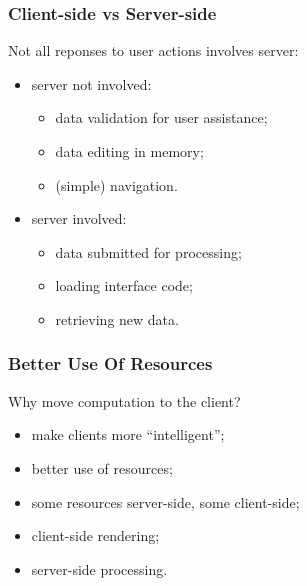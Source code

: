 \documentclass[svgnames]{beamer}
\begin{document}
\begin{frame}
\frametitle{Client-side vs Server-side}

Not all reponses to user actions involves server:
\begin{itemize}
\item server not involved:
  \begin{itemize}
  \item data validation for user assistance;
  \item data editing in memory;
  \item (simple) navigation.
  \end{itemize}

\item server involved:
  \begin{itemize}
  \item data submitted for processing;
  \item loading interface code;
  \item retrieving new data.
  \end{itemize}
\end{itemize}
\end{frame}


\begin{frame}\frametitle{Better Use Of Resources}

Why move computation to the client?
\begin{itemize}
\item make clients more ``intelligent'';
\item better use of resources;
\item some resources server-side, some client-side;
\item client-side rendering;
\item server-side processing.
\end{itemize}
\end{frame}
\end{document}
